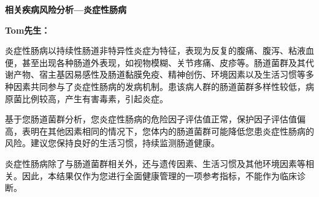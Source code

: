 \bigskip
{}
\newpage

\setlength{\arrayrulewidth}{0.5pt}
\fontsize{9.3pt}{17pt}\selectfont
\color{gray2}

\vspace*{0mm}
\begin{center}
{\bf\sanhao 相关疾病风险分析—炎症性肠病}
\end{center}

\medskip

\noindent
{\bf\xiaosihao Tom先生：}


\bigskip
炎症性肠病以持续性肠道非特异性炎症为特征，表现为反复的腹痛、腹泻、粘液血便，甚至出现各种肠道外表现，如视物模糊、关节疼痛、皮疹等。肠道菌群及其代谢产物、宿主基因易感性及肠道黏膜免疫、精神创伤、环境因素以及生活习惯等多种因素共同参与了炎症性肠病的发病机制。患该病人群的肠道菌群多样性较低，病原菌比例较高，产生有害毒素，引起炎症。

基于您肠道菌群分析，您炎症性肠病的危险因子评估值正常，保护因子评估值偏高，表明在其他因素相同的情况下，您体内的肠道菌群可能降低您患炎症性肠病的风险。建议您保持良好的生活习惯，持续监测肠道健康。

炎症性肠病除了与肠道菌群相关外，还与遗传因素、生活习惯及其他环境因素等相关。因此，本结果仅作为您进行全面健康管理的一项参考指标，不能作为临床诊断。

